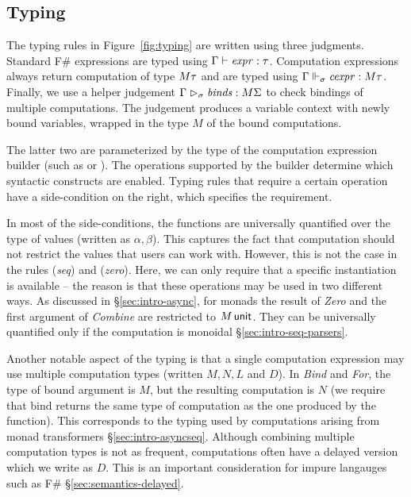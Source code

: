 \documentclass[runningheads,a4paper]{llncs}
\begin{document}

\subsection{Typing}
\label{sec:semantics-typing}

The typing rules in Figure~\ref{fig:typing} are written using three judgments. Standard F\# 
expressions are typed using $\Gamma \vdash \textnormal{\emph{expr}} : \tau$. Computation expressions always return
computation of type $M \tau$ and are typed using $\Gamma \Vdash_\sigma \textnormal{\emph{cexpr}} : M \tau$.
Finally, we use a helper judgement $\Gamma \vartriangleright_\sigma \textnormal{\emph{binds}} : M \Sigma$ to check bindings
of multiple computations. The judgement produces a variable context with newly bound variables, 
wrapped in the type $M$ of the bound computations.

The latter two are parameterized by the type of the computation expression builder (such as
 or ). The operations supported by the builder determine which syntactic
constructs are enabled. Typing rules that require a certain operation have a side-condition
on the right, which specifies the requirement.

In most of the side-conditions, the functions are universally quantified over the type of values
(written as $\alpha, \beta$). This captures the fact that computation should not restrict the 
values that users can work with. However, this is not the case in the rules (\emph{seq}) and 
(\emph{zero}). Here, we can only require that a specific instantiation is available -- the reason 
is that these operations may be used in two different ways. As discussed in \S\ref{sec:intro-async}, 
for monads the result of \emph{Zero} and the first argument of \emph{Combine} are restricted to
$M\,\textnormal{\sffamily unit}$. They can be universally quantified only if the computation is monoidal 
\S\ref{sec:intro-seq-parsers}.

Another notable aspect of the typing is that a single computation expression may use multiple
computation types (written $M, N, L$ and $D$). In \emph{Bind} and \emph{For}, the type of bound
argument is $M$, but the resulting computation is $N$ (we require that bind returns the same
type of computation as the one produced by the function). This corresponds to the typing used
by computations arising from monad transformers \S\ref{sec:intro-asyncseq}. Although combining
multiple computation types is not as frequent, computations often have a delayed version which
we write as $D$. This is an important consideration for impure langauges such as F\# 
\S\ref{sec:semantics-delayed}.
\end{document}
